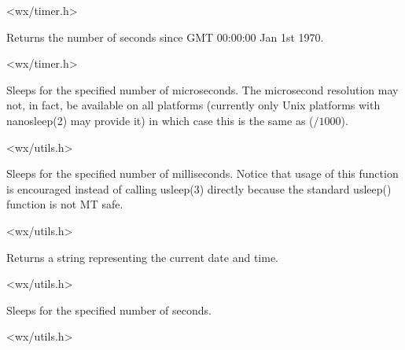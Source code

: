 <wx/timer.h>


\label{wxgetutctime}


Returns the number of seconds since GMT 00:00:00 Jan 1st 1970.




<wx/timer.h>


\label{wxmicrosleep}


Sleeps for the specified number of microseconds. The microsecond resolution may
not, in fact, be available on all platforms (currently only Unix platforms with
nanosleep(2) may provide it) in which case this is the same as
($/1000$).


<wx/utils.h>


\label{wxmillisleep}


Sleeps for the specified number of milliseconds. Notice that usage of this
function is encouraged instead of calling usleep(3) directly because the
standard usleep() function is not MT safe.


<wx/utils.h>


\label{wxnow}


Returns a string representing the current date and time.


<wx/utils.h>


\label{wxsleep}


Sleeps for the specified number of seconds.


<wx/utils.h>


\label{wxstarttimer}

